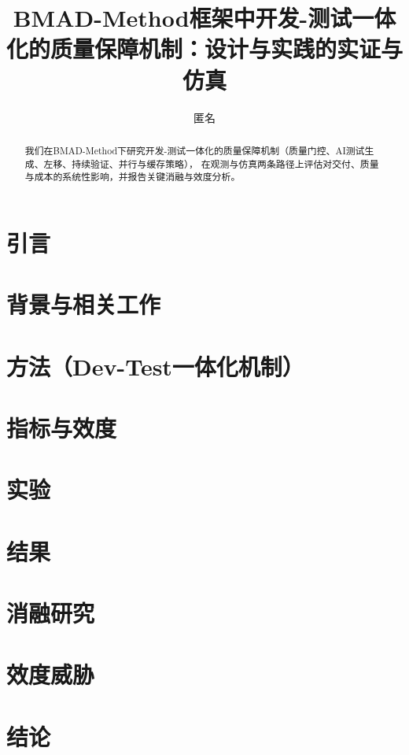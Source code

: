 \documentclass[UTF8]{ctexart}
\title{BMAD-Method框架中开发-测试一体化的质量保障机制：设计与实践的实证与仿真}
\author{匿名}
\date{}
\begin{document}
\maketitle

\begin{abstract}
我们在BMAD-Method下研究开发-测试一体化的质量保障机制（质量门控、AI测试生成、左移、持续验证、并行与缓存策略），
在观测与仿真两条路径上评估对交付、质量与成本的系统性影响，并报告关键消融与效度分析。
\end{abstract}

\section{引言}

\section{背景与相关工作}

\section{方法（Dev-Test一体化机制）}

\section{指标与效度}

\section{实验}

\section{结果}

\section{消融研究}

\section{效度威胁}

\section{结论}



\end{document}
